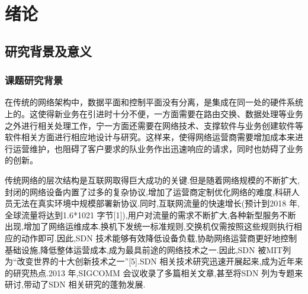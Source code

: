 \chapter{绪论}
\section{研究背景及意义}
\subsection{课题研究背景}
在传统的网络架构中，数据平面和控制平面没有分离，是集成在同一处的硬件系统上的。这使得新业务在引进时十分不便，一方面需要在路由交换、数据处理等业务之外进行相关处理工作，宁一方面还需要在网络技术、支撑软件与业务创建软件等软件相关方面进行相应地设计与研究。这样来，使得网络运营商需要增加成本来进行运营维护，也阻碍了客户要求的队业务作出迅速响应的请求，同时也妨碍了业务的创新。

传统网络的层次结构是互联网取得巨大成功的关键.但是随着网络规模的不断扩大,封闭的网络设备内置了过多的复杂协议,增加了运营商定制优化网络的难度,科研人员无法在真实环境中规模部署新协议.同时,互联网流量的快速增长(预计到2018 年,全球流量将达到1.6*1021 字节[1]),用户对流量的需求不断扩大,各种新型服务不断出现,增加了网络运维成本.换机下发统一标准规则,交换机仅需按照这些规则执行相应的动作即可.因此,SDN 技术能够有效降低设备负载,协助网络运营商更好地控制基础设施,降低整体运营成本,成为最具前途的网络技术之一.因此,SDN 被MIT列为“改变世界的十大创新技术之一”[5].SDN 相关技术研究迅速开展起来,成为近年来的研究热点.2013 年,SIGCOMM 会议收录了多篇相关文章,甚至将SDN 列为专题来研讨,带动了SDN 相关研究的蓬勃发展.

